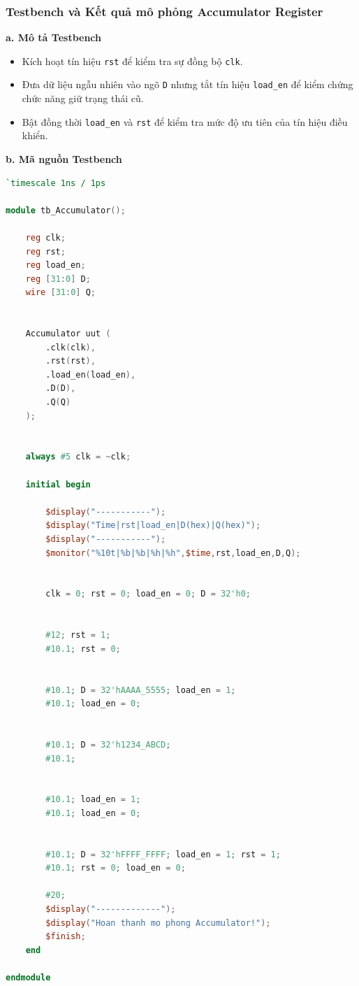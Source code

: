 \subsubsection{Testbench và Kết quả mô phỏng Accumulator Register}

\textbf{a. Mô tả Testbench} \\
\begin{itemize}
    \item Kích hoạt tín hiệu \texttt{rst} để kiểm tra sự đồng bộ \texttt{clk}.
    \item Đưa dữ liệu ngẫu nhiên vào ngõ \texttt{D} nhưng tắt tín hiệu \texttt{load\_en} để kiểm chứng chức năng giữ trạng thái cũ.
    \item Bật đồng thời \texttt{load\_en} và \texttt{rst} để kiểm tra mức độ ưu tiên của tín hiệu điều khiển.
\end{itemize}

\textbf{b. Mã nguồn Testbench}
\begin{lstlisting}[language=Verilog, caption={Testbench Accumulator Register}]
`timescale 1ns / 1ps

module tb_Accumulator();

    reg clk;
    reg rst;
    reg load_en;
    reg [31:0] D;
    wire [31:0] Q;

 
    Accumulator uut (
        .clk(clk),
        .rst(rst),
        .load_en(load_en),
        .D(D),
        .Q(Q)
    );

   
    always #5 clk = ~clk;

    initial begin
       
        $display("-----------");
        $display("Time|rst|load_en|D(hex)|Q(hex)");
        $display("-----------");
        $monitor("%10t|%b|%b|%h|%h",$time,rst,load_en,D,Q);

       
        clk = 0; rst = 0; load_en = 0; D = 32'h0;

       
        #12; rst = 1;     
        #10.1; rst = 0;    

      
        #10.1; D = 32'hAAAA_5555; load_en = 1; 
        #10.1; load_en = 0;                    
        
      
        #10.1; D = 32'h1234_ABCD;
        #10.1; 

      
        #10.1; load_en = 1;
        #10.1; load_en = 0;

      
        #10.1; D = 32'hFFFF_FFFF; load_en = 1; rst = 1; 
        #10.1; rst = 0; load_en = 0; 

        #20;
        $display("-------------");
        $display("Hoan thanh mo phong Accumulator!");
        $finish;
    end

endmodule
\end{lstlisting}

